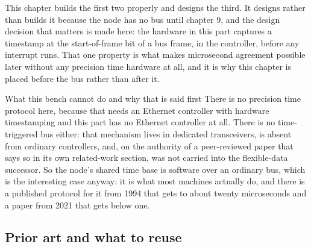 This chapter builds the first two properly and designs the third. It designs
rather than builds it because the node has no bus until chapter 9, and the
design decision that matters is made here: the hardware in this part captures a
timestamp at the start-of-frame bit of a bus frame, in the controller, before
any interrupt runs. That one property is what makes microsecond agreement
possible later without any precision time hardware at all, and it is why this
chapter is placed before the bus rather than after it.

\begin{note}{What this bench cannot do and why that is said first}
There is no precision time protocol here, because that needs an Ethernet
controller with hardware timestamping and this part has no Ethernet controller
at all. There is no time-triggered bus either: that mechanism lives in dedicated
transceivers, is absent from ordinary controllers, and, on the authority of a
peer-reviewed paper that says so in its own related-work section, was not
carried into the flexible-data successor. So the node's shared time base is
software over an ordinary bus, which is the interesting case anyway: it is what
most machines actually do, and there is a published protocol for it from 1994
that gets to about twenty microseconds and a paper from 2021 that gets below one.
\end{note}

\subsection*{Prior art and what to reuse}

